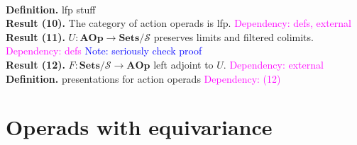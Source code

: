 \documentclass{amsart}
\begin{document}
\\ \textbf{Definition.} lfp stuff
\\ \textbf{Result (10).} The category of action operads is lfp. \textcolor{magenta}{Dependency: defs, external}
\\ \textbf{Result (11).} $U: \mathbf{AOp} \to \mathbf{Sets}/\mathcal{S}$ preserves limits and filtered colimits. \textcolor{magenta}{Dependency: defs} \textcolor{blue}{Note: seriously check proof}
\\ \textbf{Result (12).} $F: \mathbf{Sets}/\mathcal{S} \to \mathbf{AOp}$ left adjoint to $U$. \textcolor{magenta}{Dependency: external}
\\ \textbf{Definition.} presentations for action operads \textcolor{magenta}{Dependency: (12)}

\section{Operads with equivariance}
\end{document}

